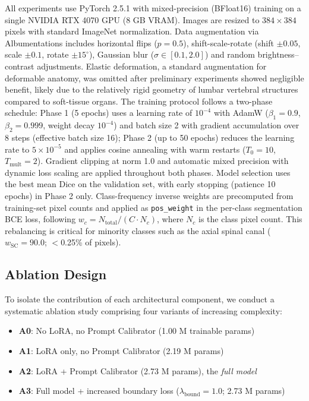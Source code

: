 \documentclass[journal]{IEEEtran}
\begin{document}
All experiments use PyTorch 2.5.1 with mixed-precision (BFloat16) training on a single NVIDIA RTX 4070 GPU (8 GB VRAM). Images are resized to $384 \times 384$ pixels with standard ImageNet normalization. Data augmentation via Albumentations \cite{buslaev2020albumentations} includes horizontal flips ($p=0.5$), shift-scale-rotate (shift $\pm 0.05$, scale $\pm 0.1$, rotate $\pm 15^\circ$), Gaussian blur ($\sigma \in [0.1, 2.0]$) and random brightness--contrast adjustments. Elastic deformation, a standard augmentation for deformable anatomy, was omitted after preliminary experiments showed negligible benefit, likely due to the relatively rigid geometry of lumbar vertebral structures compared to soft-tissue organs.
The training protocol follows a two-phase schedule: Phase 1 (5 epochs) uses a learning rate of $10^{-4}$ with AdamW ($\beta_1=0.9$, $\beta_2=0.999$, weight decay $10^{-4}$) and batch size 2 with gradient accumulation over 8 steps (effective batch size 16); Phase 2 (up to 50 epochs) reduces the learning rate to $5{\times}10^{-5}$ and applies cosine annealing with warm restarts ($T_0=10$, $T_\text{mult}=2$).
Gradient clipping at norm 1.0 and automatic mixed precision with dynamic loss scaling are applied throughout both phases. Model selection uses the best mean Dice on the validation set, with early stopping (patience 10 epochs) in Phase 2 only. Class-frequency inverse weights are precomputed from training-set pixel counts and applied as \texttt{pos\_weight} in the per-class segmentation BCE loss, following $w_c = N_\text{total} / (C \cdot N_c)$, where $N_c$ is the class pixel count. This rebalancing is critical for minority classes such as the axial spinal canal ($w_\text{SC}=90.0$; $<$0.25\% of pixels).

\subsection{Ablation Design}
\label{sec:ablation}
To isolate the contribution of each architectural component, we conduct a systematic ablation study comprising four variants of increasing complexity:
\begin{itemize}
    \item \textbf{A0}: No LoRA, no Prompt Calibrator (1.00 M trainable params)
    \item \textbf{A1}: LoRA only, no Prompt Calibrator (2.19 M params)
    \item \textbf{A2}: LoRA + Prompt Calibrator (2.73 M params), the \emph{full model}
    \item \textbf{A3}: Full model + increased boundary loss ($\lambda_\text{bound}=1.0$; 2.73 M params)
\end{itemize}
\end{document}
